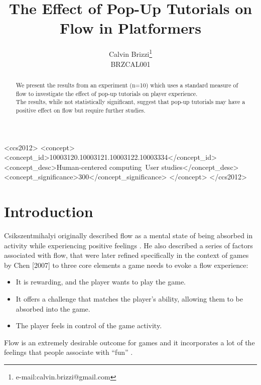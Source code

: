 \documentclass{acmsiggraph}
\title{The Effect of Pop-Up Tutorials on Flow in Platformers}
\author{Calvin Brizzi\thanks{e-mail:calvin.brizzi@gmail.com}\\BRZCAL001}
\begin{document}


\maketitle

\begin{abstract}

We present the results from an experiment (n=10) which uses a standard measure of flow to investigate the effect of pop-up tutorials on player experience.\\
The results, while not statistically significant, suggest that pop-up tutorials may have a positive effect on flow but require further studies.

\end{abstract}

%
%
\begin{CCSXML}
<ccs2012>
<concept>
<concept_id>10003120.10003121.10003122.10003334</concept_id>
<concept_desc>Human-centered computing~User studies</concept_desc>
<concept_significance>300</concept_significance>
</concept>
</ccs2012>
\end{CCSXML}


%
%


\keywordlist

\conceptlist

\printcopyright

\section{Introduction}
Csikszentmihalyi originally described flow as a mental state of being absorbed in activity while experiencing positive feelings \cite{optimal}. He also described a series of factors associated with flow, that were later refined specifically in the context of games by Chen [2007] to three core elements a game needs to evoke a flow experience:
\begin{itemize}
\item It is rewarding, and the player wants to play the game.
\item It offers a challenge that matches the player’s ability, allowing them to be absorbed into the game.
\item The player feels in control of the game activity.
\end{itemize}
Flow is an extremely desirable outcome for games and it incorporates a lot of the feelings that people associate with ``fun'' \cite{flow}.
\end{document}
